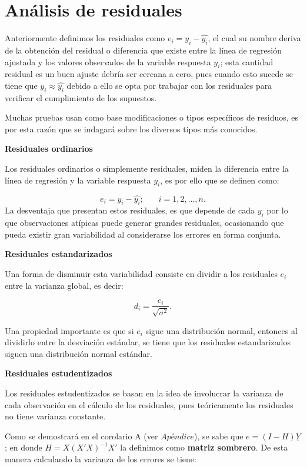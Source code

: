 \documentclass[
  a4paper,
  oneside,
  openany]{book}
\begin{document}
\hypertarget{anuxe1lisis-de-residuales}{%
\section{Análisis de residuales}\label{anuxe1lisis-de-residuales}}

Anteriormente definimos los residuales como \(e_{i}=y_{i}-\hat{y_{i}}\), el cual su nombre deriva de la obtención del residual o diferencia que existe entre la línea de regresión ajustada y los valores observados de la variable respuesta \(y_{i}\); esta cantidad residual es un buen ajuste debría ser cercana a cero, pues cuando esto sucede se tiene que \(y_{i} \approx \hat{y_{i}}\) debido a ello se opta por trabajar con los residuales para verificar el cumplimiento de los supuestos.

Muchas pruebas usan como base modificaciones o tipos específicos de residuos, es por esta razón que se indagará sobre los diversos tipos más conocidos.

\textbf{Residuales ordinarios}

Los residuales ordinarios o simplemente residuales, miden la diferencia entre la línea de regresión y la variable respuesta \(y_{i}\), es por ello que se definen como:

\[e_{i}=y_{i}-\hat{y_{i}};  \ \ \ \ \ \ \ \ i=1,2,\ldots ,n.\]
La desventaja que presentan estos residuales, es que depende de cada \(y_{i}\) por lo que observaciones atípicas puede generar grandes residuales, ocasionando que pueda existir gran variabilidad al considerarse los errores en forma conjunta.

\textbf{Residuales estandarizados}

Una forma de disminuir esta variabilidad consiste en dividir a los residuales \(e_{i}\) entre la varianza global, es decir:

\[d_{i}=\frac{e_{i}}{\sqrt{\sigma^2}}.\]

Una propiedad importante es que si \(e_{i}\) sigue una distribución normal, entonces al dividirlo entre la desviación estándar, se tiene que los residuales estandarizados siguen una distribución normal estándar.

\textbf{Residuales estudentizados}

Los residuales estudentizados se basan en la idea de involucrar la varianza de cada observación en el cálculo de los residuales, pues teóricamente los residuales no tiene varianza constante.

Como se demostrará en el corolario A (ver \(Apéndice\)), se sabe que \(e=(I-H)\underline{Y}\); en donde \(H=X(X'X)^{-1}X'\) la definimos como \textbf{matriz sombrero}.
De esta manera calculando la varianza de los errores se tiene:
\end{document}
